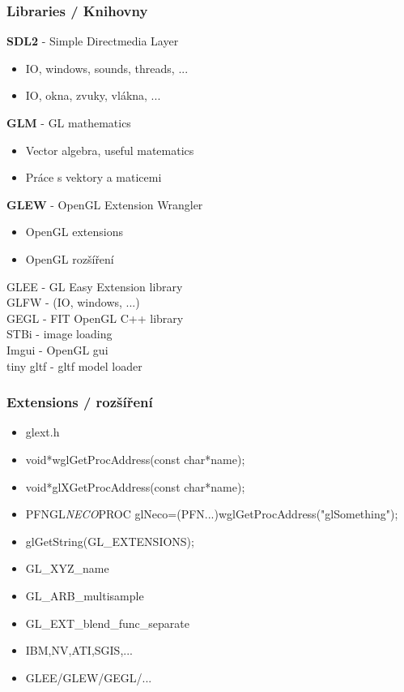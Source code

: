 
\begin{frame}\frametitle{Libraries / Knihovny}\scriptsize
  \textbf{SDL2} - Simple Directmedia Layer
  \begin{itemize}
    \item IO, windows, sounds, threads, ...
    \item IO, okna, zvuky, vlákna, ...
  \end{itemize}
  \textbf{GLM} - GL mathematics
  \begin{itemize}
    \item Vector algebra, useful matematics
    \item Práce s vektory a maticemi
  \end{itemize}
  \textbf{GLEW} - OpenGL Extension Wrangler
  \begin{itemize}
    \item OpenGL extensions
    \item OpenGL rozšíření
  \end{itemize}
  GLEE - GL Easy Extension library\\
  GLFW - (IO, windows, ...)\\
  GEGL - FIT OpenGL C++ library\\
  STBi - image loading\\
  Imgui - OpenGL gui\\
  tiny gltf - gltf model loader
\end{frame}

\begin{frame}\frametitle{Extensions / rozšíření}\scriptsize
  \begin{itemize}
    \item{glext.h}
    \item{void*wglGetProcAddress(const char*name);}
    \item{void*glXGetProcAddress(const char*name);}
    \item{PFNGL{\it NECO}PROC glNeco=(PFN...)wglGetProcAddress("glSomething");}
    \item{glGetString(GL\_EXTENSIONS);}
    \item{GL\_XYZ\_name}
    \item{GL\_ARB\_multisample}
    \item{GL\_EXT\_blend\_func\_separate}
    \item{IBM,NV,ATI,SGIS,...}
    \item{GLEE/GLEW/GEGL/...}
  \end{itemize}
\end{frame}

